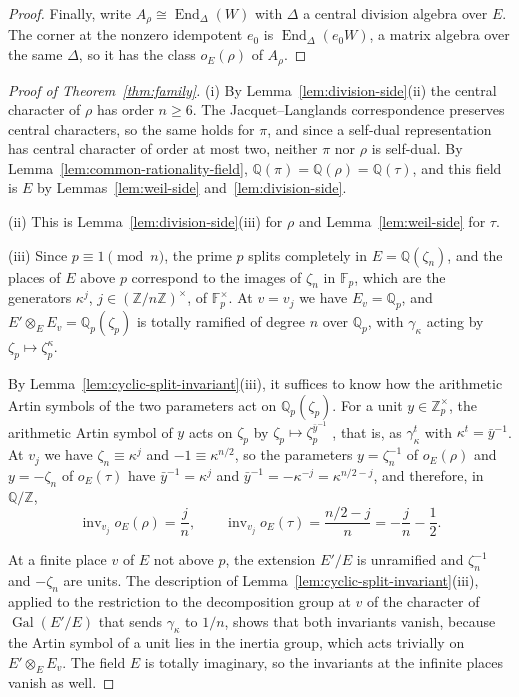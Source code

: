 \documentclass[a4paper,11pt]{amsart}
\theoremstyle{definition}
\theoremstyle{remark}
\numberwithin{equation}{section}
\newcommand{\Q}{\mathbb{Q}}
\newcommand{\Z}{\mathbb{Z}}
\DeclareMathOperator{\inv}{inv}
\DeclareMathOperator{\End}{End}
\DeclareMathOperator{\Gal}{Gal}
\newcommand{\F}{\mathbb{F}}
\begin{document}
\begin{proof}
Finally, write $A_\rho\cong\End_\Delta(W)$ with $\Delta$ a central division algebra over $E$. The corner at the nonzero idempotent $e_0$ is $\End_\Delta(e_0W)$, a matrix algebra over the same $\Delta$, so it has the class $o_E(\rho)$ of $A_\rho$.
\end{proof}

\begin{proof}[Proof of Theorem~\ref{thm:family}]
(i) By Lemma~\ref{lem:division-side}(ii) the central character of $\rho$ has order $n\ge6$. The Jacquet--Langlands correspondence preserves central characters, so the same holds for $\pi$, and since a self-dual representation has central character of order at most two, neither $\pi$ nor $\rho$ is self-dual. By Lemma~\ref{lem:common-rationality-field}, $\Q(\pi)=\Q(\rho)=\Q(\tau)$, and this field is $E$ by Lemmas~\ref{lem:weil-side} and~\ref{lem:division-side}.

(ii) This is Lemma~\ref{lem:division-side}(iii) for $\rho$ and Lemma~\ref{lem:weil-side} for $\tau$.

(iii) Since $p\equiv1\pmod n$, the prime $p$ splits completely in $E=\Q(\zeta_n)$, and the places of $E$ above $p$ correspond to the images of $\zeta_n$ in $\F_p$, which are the generators $\kappa^j$, $j\in(\Z/n\Z)^\times$, of $\F_p^\times$. At $v=v_j$ we have $E_v=\Q_p$, and $E'\otimes_EE_v=\Q_p(\zeta_p)$ is totally ramified of degree $n$ over $\Q_p$, with $\gamma_\kappa$ acting by $\zeta_p\mapsto\zeta_p^\kappa$.

By Lemma~\ref{lem:cyclic-split-invariant}(iii), it suffices to know how the arithmetic Artin symbols of the two parameters act on $\Q_p(\zeta_p)$. For a unit $y\in\Z_p^\times$, the arithmetic Artin symbol of $y$ acts on $\zeta_p$ by $\zeta_p\mapsto\zeta_p^{\bar y^{-1}}$ \cite[I, Example~3.13]{Mil20}, that is, as $\gamma_\kappa^t$ with $\kappa^t=\bar y^{-1}$. At $v_j$ we have $\zeta_n\equiv\kappa^j$ and $-1\equiv\kappa^{n/2}$, so the parameters $y=\zeta_n^{-1}$ of $o_E(\rho)$ and $y=-\zeta_n$ of $o_E(\tau)$ have $\bar y^{-1}=\kappa^j$ and $\bar y^{-1}=-\kappa^{-j}=\kappa^{n/2-j}$, and therefore, in $\Q/\Z$,
\[
 \inv_{v_j}o_E(\rho)=\frac jn,\qquad \inv_{v_j}o_E(\tau)=\frac{n/2-j}n=-\frac jn-\frac12.
\]

At a finite place $v$ of $E$ not above $p$, the extension $E'/E$ is unramified and $\zeta_n^{-1}$ and $-\zeta_n$ are units. The description of Lemma~\ref{lem:cyclic-split-invariant}(iii), applied to the restriction to the decomposition group at $v$ of the character of $\Gal(E'/E)$ that sends $\gamma_\kappa$ to $1/n$, shows that both invariants vanish, because the Artin symbol of a unit lies in the inertia group, which acts trivially on $E'\otimes_EE_v$. The field $E$ is totally imaginary, so the invariants at the infinite places vanish as well.


\end{proof}
\end{document}
